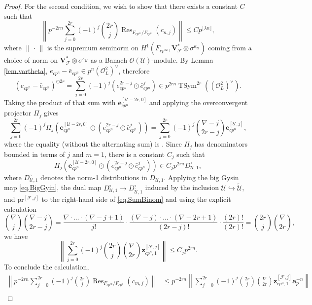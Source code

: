 \documentclass[a4paper]{amsart}
\numberwithin{equation}{section}
\theoremstyle{definition}
\DeclareMathOperator{\TSym}{TSym}
\DeclareMathOperator{\Res}{Res}
\begin{document}
\begin{proof}
For the second condition, we wish to show that there exists a constant $C$ such that \[\left\|p^{-2rn}\sum_{j=0}^{2r}(-1)^j\binom{2r}{j}\Res_{F_{cp^\infty}/F_{cp^n}}(c_{n,j})\right\|\le Cp^{\lfloor\lambda n\rfloor},\] where $\|\,\cdot\,\|$ is the supremum seminorm on $H^1(F_{cp^\infty},\mathbf{V}_\mathscr{F}^\ast{\otimes}\sigma^{\kappa_{{\mathscr{U}}}})$ coming from a choice of norm on $\mathbf{V}_\mathscr{F}^\ast{\otimes}\sigma^{\kappa_{{\mathscr{U}}}}$ as a Banach $\mathcal{O}(\mathscr{U})$-module. By Lemma \ref{lem.vartheta}, $e_{cp^n}-\bar{e}_{cp^n}\in p^n(\mathcal{O}_L^2)^\vee$, therefore\[(e_{cp^n}-\bar{e}_{cp^n})^{\odot 2r}=\sum_{j=0}^{2r} (-1)^j(e_{cp^n}^{2r-j}\odot \bar{e}_{cp^n}^j)\in p^{2rn}\TSym^{2r}((\mathcal{O}_L^2)^\vee).\] Taking the product of that sum with $\mathbf{e}_{cp^n}^{[\mathscr{U}-2r,0]}$ and applying the overconvergent projector $\Pi_j$ gives
\begin{equation}\label{eq.SumBinom}
\sum_{j=0}^{2r} (-1)^j\Pi_j(\mathbf{e}_{cp^n}^{[\mathscr{U}-2r,0]}\odot(e_{cp^n}^{2r-j}\odot \bar{e}_{cp^n}^j))=\sum_{j=0}^{2r}(-1)^j\binom{\nabla-j}{2r-j}\mathbf{e}_{cp^n}^{[\mathscr{U},j]},
\end{equation}
where the equality (without the alternating sum) is \cite[Lemma 5.1.5]{LoefflerZerbes.Rankin}. Since $\Pi_j$ has denominators bounded in terms of $j$ and $m=1$, there is a constant $C_{j}$ such that \[\Pi_j(\mathbf{e}_{cp^n}^{[\mathscr{U}-2r,0]}\odot(e_{cp^n}^{2r-j}\odot \bar{e}_{cp^n}^j))\in C_{j}p^{2rn}D_{\mathscr{U},1}^\circ,\] where $D_{\mathscr{U},1}^\circ$ denotes the norm-1 distributions in $D_{\mathscr{U},1}$. Applying the big Gysin map \eqref{eq.BigGyin}, the dual map $D_{\mathscr{U},1}^\circ\to D_{\widetilde{\mathscr{U}},1}^\circ$ induced by the inclusion $\mathscr{U}\hookrightarrow\widetilde{\mathscr{U}}$, and $\mathrm{pr}^{[\mathscr{F},j]}$ to the right-hand side of \eqref{eq.SumBinom} and using the explicit calculation \[\binom{\nabla}{j}\binom{\nabla-j}{2r-j}=\dfrac{\nabla\cdot\ldots\cdot(\nabla-j+1)}{j!}\cdot\dfrac{(\nabla-j)\cdot\ldots\cdot(\nabla-2r+1)}{(2r-j)!}\cdot\dfrac{(2r)!}{(2r)!}=\binom{2r}{j}\binom{\nabla}{2r},\] we have \[\left\|\sum_{j=0}^{2r}(-1)^j\binom{2r}{j}\binom{\nabla}{2r}\mathbf{z}^{[\mathscr{F},j]}_{cp^n,1}\right\|\le C_{j}p^{2rn}.\] To conclude the calculation,
\begin{align*}
\left\|p^{-2rn}\sum_{j=0}^{2r}(-1)^j\binom{2r}{j}\Res_{F_{cp^\infty}/F_{cp^n}}(c_{m,j})\right\|&\le p^{-2rn}\left\|\sum_{j=0}^{2r}(-1)^j\binom{2r}{j}\binom{\nabla}{2r}\mathbf{z}^{[\mathscr{F},j]}_{cp^n,1}\mathbf{a}_p^{-n}\right\|\\

\end{align*}
\end{proof}
\end{document}
